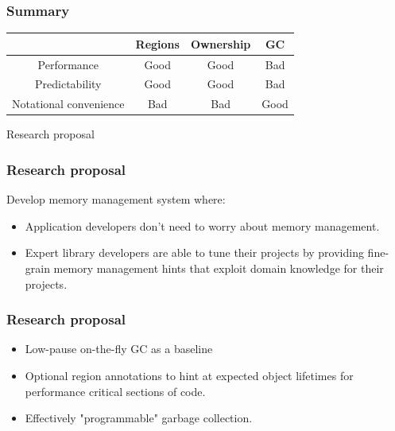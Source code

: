 \begin{frame}
    \frametitle{Summary}
    \Large
    \newcommand{\Best}{{\color{seagreen} Good}}
    \newcommand{\Worst}{{\color{alizarin} Bad}}
    \begin{center}
        \begin{tabular}{c | c | c | c}
                                   & Regions & Ownership & GC     \\
                                   \hline
            Performance            & \Best   & \Best     & \Worst \\
            Predictability         & \Best   & \Best     & \Worst \\
            Notational convenience & \Worst  & \Worst    & \Best

        \end{tabular}
    \end{center}
\end{frame}

\begin{frame}
    \begin{center}
        {\LARGE Research proposal}
    \end{center}
\end{frame}

\begin{frame}
    \frametitle{Research proposal}
    Develop memory management system where:
    \begin{itemize}
        \item
            Application developers don't need to worry about memory
            management.
        \item
            Expert library developers are able to tune their projects
            by providing fine-grain memory management hints that
            exploit domain knowledge for their projects.
    \end{itemize}
\end{frame}


\begin{frame}
    \frametitle{Research proposal}
    \begin{itemize}
        \item
            Low-pause on-the-fly GC as a baseline
        \item
            Optional region annotations to hint at
            expected object lifetimes for performance
            critical sections of code.
        \item
            Effectively "programmable" garbage collection.
    \end{itemize}
\end{frame}
